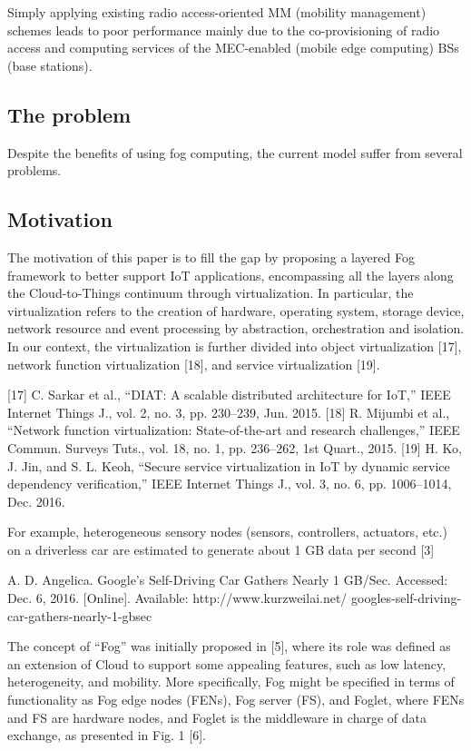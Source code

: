 Simply applying existing radio access-oriented
MM (mobility management) schemes leads to poor performance mainly due to the
co-provisioning of radio access and computing services of the
MEC-enabled (mobile edge computing) BSs (base stations).


\subsection{The problem}
\noindent\tab Despite the benefits of using fog computing, the current model suffer from several problems. \cite{Armbrust:10} \\

\subsection{Motivation}
The motivation of this paper is to fill the gap by proposing
a layered Fog framework to better support IoT applications,
encompassing all the layers along the Cloud-to-Things continuum
through virtualization. In particular, the virtualization
refers to the creation of hardware, operating system, storage
device, network resource and event processing by abstraction,
orchestration and isolation. In our context, the virtualization is
further divided into object virtualization [17], network function
virtualization [18], and service virtualization [19].

[17] C. Sarkar et al., “DIAT: A scalable distributed architecture for IoT,”
IEEE Internet Things J., vol. 2, no. 3, pp. 230–239, Jun. 2015.
[18] R. Mijumbi et al., “Network function virtualization: State-of-the-art
and research challenges,” IEEE Commun. Surveys Tuts., vol. 18, no. 1,
pp. 236–262, 1st Quart., 2015.
[19] H. Ko, J. Jin, and S. L. Keoh, “Secure service virtualization in IoT
by dynamic service dependency verification,” IEEE Internet Things J.,
vol. 3, no. 6, pp. 1006–1014, Dec. 2016.

For example, heterogeneous sensory
nodes (sensors, controllers, actuators, etc.) on a driverless car
are estimated to generate about 1 GB data per second [3]

A. D. Angelica. Google’s Self-Driving Car Gathers Nearly 1 GB/Sec.
Accessed: Dec. 6, 2016. [Online]. Available: http://www.kurzweilai.net/
googles-self-driving-car-gathers-nearly-1-gbsec


The concept of “Fog” was initially proposed in [5], where
its role was defined as an extension of Cloud to support some
appealing features, such as low latency, heterogeneity, and
mobility. More specifically, Fog might be specified in terms
of functionality as Fog edge nodes (FENs), Fog server (FS),
and Foglet, where FENs and FS are hardware nodes, and
Foglet is the middleware in charge of data exchange, as
presented in Fig. 1 [6].

